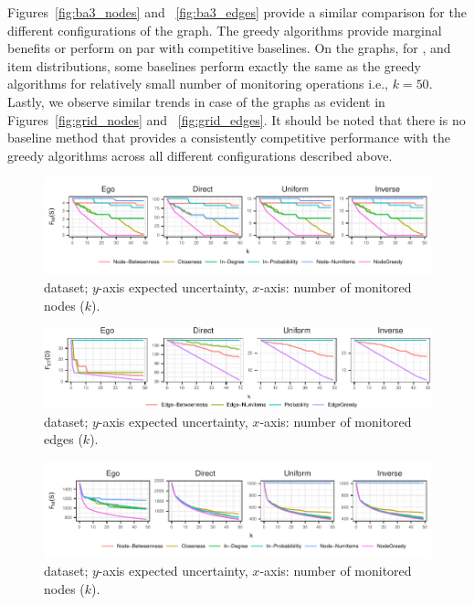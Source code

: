 Figures~\ref{fig:ba3_nodes} and ~\ref{fig:ba3_edges} provide a similar comparison
for the different configurations of the {\ba} graph. The greedy algorithms
provide marginal benefits or perform on par with competitive baselines. On the
{\ba} graphs, for {\direct}, {\uniform} and {\inverse} item distributions, some baselines
perform exactly the same as the greedy algorithms for relatively small number of
monitoring operations i.e., $k=50$. Lastly, we observe similar trends in case of the
{\grid} graphs as evident in Figures~\ref{fig:grid_nodes} and ~\ref{fig:grid_edges}.
It should be noted that there is no baseline method that provides a consistently competitive
performance with the greedy algorithms across all different configurations described above.
\balance

\begin{figure}
\centering
\includegraphics{figures/geo_nodes.pdf}
\caption{{\nodeproblem} {\geo} dataset; $y$-axis expected uncertainty, 
$x$-axis: number of monitored nodes ($k$).}
\label{fig:geo_nodes}
\end{figure}

\begin{figure}
\centering
\includegraphics{figures/geo_edges.pdf}
\caption{{\edgeproblem} {\geo} dataset; $y$-axis expected uncertainty, 
$x$-axis: number of monitored edges ($k$).}
\label{fig:geo_edges}
\end{figure}

\begin{figure}
\centering
\includegraphics{figures/ass_nodes.pdf}
\caption{{\nodeproblem} {\autonomoussystems} dataset; $y$-axis expected uncertainty, 
$x$-axis: number of monitored nodes ($k$).}
\label{fig:ass_nodes}
\end{figure}

